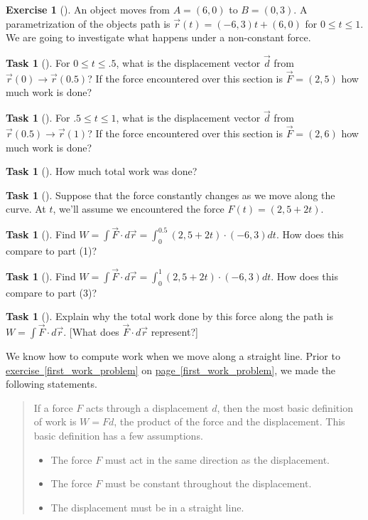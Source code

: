 \documentclass[10pt,]{book}
\theoremstyle{plain}
\theoremstyle{definition}
\theoremstyle{definition}
\theoremstyle{definition}
\theoremstyle{definition}
\newtheorem{exploration}[project]{Exercise}
\newtheorem{task}[project]{Task}
\theoremstyle{definition}
\numberwithin{equation}{section}
\newcommand{\ds}{\displaystyle}
\begin{document}
\begin{exploration}[]\label{exploration-190}
An object moves from \(A=(6,0)\) to \(B=(0,3)\). A parametrization of the objects path is \(\vec r(t) = (-6,3)t+(6,0)\) for \(0\leq t\leq 1\). We are going to investigate what happens under a non-constant force.%
\begin{task}[]\label{task-464}
For \(0\leq t\leq .5\), what is the displacement vector \(\vec{d}\) from \(\vec{r}(0) \rightarrow \vec{r}(0.5)\)? If the force encountered over this section is \(\vec F = (2,5)\) how much work is done?%
\end{task}
\begin{task}[]\label{task-465}
For \(.5\leq t\leq 1\), what is the displacement vector \(\vec{d}\) from \(\vec{r}(0.5) \rightarrow \vec{r}(1)\)? If the force encountered over this section is \(\vec F = (2,6)\) how much work is done?%
\end{task}
\begin{task}[]\label{task-466}
How much total work was done?%
\end{task}
\begin{task}[]\label{task-467}
Suppose that the force constantly changes as we move along the curve. At \(t\), we'll assume we encountered the force \(F(t) = (2,5+2t)\).%
\begin{task}[]\label{task-468}
Find \(\ds W=\int \vec F\cdot d\vec r = \int_0^{0.5} (2,5+2t)\cdot (-6,3)dt.\) How does this compare to part (1)?%
\end{task}
\begin{task}[]\label{task-469}
Find \(\ds W=\int \vec F\cdot d\vec r = \int_0^1 (2,5+2t)\cdot (-6,3)dt.\) How does this compare to part (3)?%
\end{task}
\end{task}
\begin{task}[]\label{task-470}
Explain why the total work done by this force along the path is \(\ds W=\int \vec F\cdot d\vec r\). [What does \(\vec{F} \cdot d\vec{r}\) represent?]%
\end{task}
\end{exploration}
We know how to compute work when we move along a straight line. Prior to \hyperref[first_work_problem]{exercise~\ref{first_work_problem}} on \hyperref[first_work_problem]{page~\ref{first_work_problem}}, we made the following statements.%
\begin{quote}\hypertarget{blockquote-5}{}
If a force \(F\) acts through a displacement \(d\), then the most basic definition of work is \(W=Fd\), the product of the force and the displacement.  This basic definition has a few assumptions. \leavevmode%
\begin{itemize}[label=\textbullet]
\item{}The force \(F\) must act in the same direction as the displacement.%
\item{}The force \(F\) must be constant throughout the  displacement.%
\item{}The displacement must be in a straight line.%
\end{itemize}
\end{quote}
\end{document}
